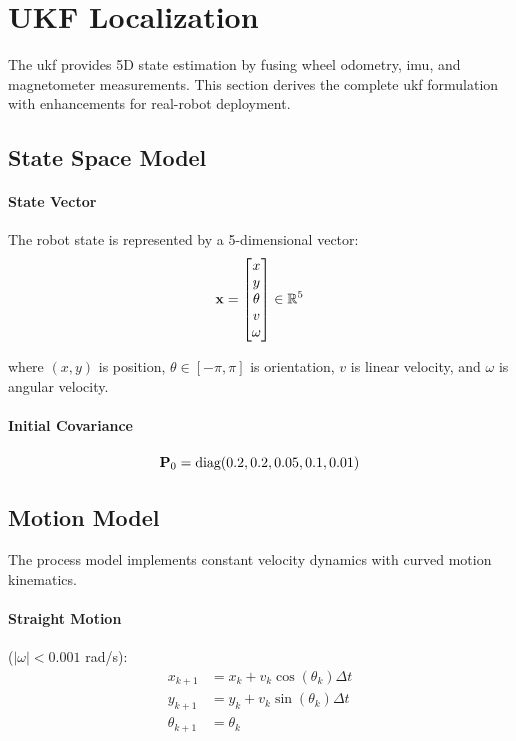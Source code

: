 \section{UKF Localization}
\label{sec:meth_ukf}

The \acrfull{ukf} provides 5D state estimation by fusing wheel odometry, \acrshort{imu}, and magnetometer measurements. This section derives the complete \acrshort{ukf} formulation with enhancements for real-robot deployment.


\subsection{State Space Model}

\paragraph{State Vector}
The robot state is represented by a 5-dimensional vector:
\begin{equation}
\mathbf{x} = \begin{bmatrix}
x \\ y \\ \theta \\ v \\ \omega
\end{bmatrix} \in \mathbb{R}^5
\label{eq:state_vector}
\end{equation}

where $(x, y)$ is position, $\theta \in [-\pi, \pi]$ is orientation, $v$ is linear velocity, and $\omega$ is angular velocity.

\paragraph{Initial Covariance}
\begin{equation}
\mathbf{P}_0 = \text{diag}(0.2, 0.2, 0.05, 0.1, 0.01)
\label{eq:initial_covariance}
\end{equation}

\subsection{Motion Model}

The process model implements constant velocity dynamics with curved motion kinematics.

\paragraph{Straight Motion} ($|\omega| < 0.001$ rad/s):
\begin{equation}
\begin{aligned}
x_{k+1} &= x_k + v_k \cos(\theta_k) \Delta t \\
y_{k+1} &= y_k + v_k \sin(\theta_k) \Delta t \\
\theta_{k+1} &= \theta_k
\end{aligned}
\label{eq:motion_straight}
\end{equation}

